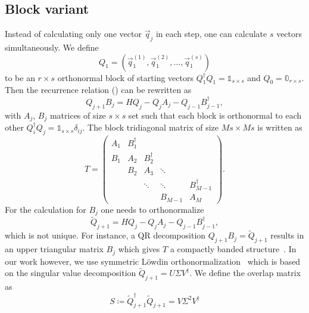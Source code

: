 \subsection{Block variant}%
\label{sec:block-lanczos}

Instead of calculating only one vector $\vec{q}_j$ in each step,
one can calculate $s$ vectors simultaneously.
We define
\begin{equation}
    Q_1 = (\vec{q}_1^{(1)}, \vec{q}_1^{(2)}, \ldots, \vec{q}_1^{(s)})
\end{equation}
to be an $r\times s$ orthonormal block of starting vectors $Q_1^\dag Q_1 = \mathbb{1}_{s\times s}$
and $Q_0 = \mathbb{0}_{r\times s}$.
Then the recurrence relation () can be rewritten as
\begin{equation}
    Q_{j+1} B_j = H Q_j - Q_j A_j - Q_{j-1} B_{j-1}^\dag,
\end{equation}
with $A_j$, $B_j$ matrices of size $s\times s$ set such that each block is orthonormal
to each other $Q_i^\dag Q_j = \mathbb{1}_{s\times s}\delta_{ij}$.
The block tridiagonal matrix of size $Ms\times Ms$ is written as
\begin{equation}
    T
    =
    \begin{pmatrix}
        A_1 & B_1^\dag &          &         &              \\
        B_1 & A_2      & B_2^\dag &         &              \\
            & B_2      & A_3      & \ddots  &              \\
            &          & \ddots   & \ddots  & B_{M-1}^\dag \\
            &          &          & B_{M-1} & A_M
    \end{pmatrix}.
    \label{eq:tridiagonal-block}
\end{equation}
For the calculation for $B_j$ one needs to orthonormalize
\begin{equation}
    \tilde Q_{j+1} = H Q_j - Q_j A_j - Q_{j-1} B_{j-1}^\dag,
\end{equation}
which is not unique.
For instance, a QR decomposition $Q_{j+1} B_j = \tilde Q_{j+1}$
results in an upper triangular matrix $B_j$
which gives $T$ a compactly banded structure~\cite{Cullum1985, Golub2013}.
In our work however, we use symmetric Löwdin orthonormalization~\cite{Lowdin1950, Brass2021}
which is based on the singular value decomposition
$\tilde Q_{j+1} = U \Sigma V^\dag$.
We define the overlap matrix as
\begin{equation}
    S \coloneqq \tilde Q_{j+1}^\dag \tilde Q_{j+1} = V \Sigma^2 V^\dag
\end{equation}
